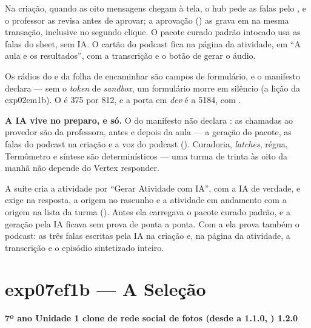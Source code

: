 Na criação, quando as oito mensagens chegam à tela, o hub pede as falas pelo
, e o professor
as revisa antes de aprovar; a aprovação () as grava
em  na mesma transação, inclusive no segundo clique. O
pacote curado padrão intocado usa as falas do sheet, sem IA. O cartão do
podcast fica na página da atividade, em \enquote{A aula e os resultados}, com a
transcrição e o botão de gerar o áudio.

\begin{atencao}
Os rádios do  e da folha de encaminhar são campos de formulário, e o manifesto declara
 --- sem o \emph{token} de \emph{sandbox}, um
formulário morre em silêncio (a lição da exp02em1b). O
 é 375 por 812, e a porta em \emph{dev} é a 5184, com
.
\end{atencao}

\begin{limitacao}
\textbf{A IA vive no preparo, e só.} O  do manifesto não
declara : as chamadas ao provedor são da professora, antes e depois da
aula --- a geração do pacote, as falas do podcast na criação e a voz do podcast
(). Curadoria, \emph{latches}, régua, Termômetro e
síntese são determinísticos --- uma turma de trinta às oito da manhã não depende
do Vertex responder.
\end{limitacao}

A suíte  cria a
atividade por \enquote{Gerar Atividade com IA}, com a IA de verdade, e exige
 na resposta, a origem  no rascunho e a atividade em
andamento com a origem  na lista da turma (). Antes ela
carregava o pacote curado padrão, e a geração pela IA ficava sem prova de ponta
a ponta. Com a  ela prova também o podcast: as três falas
escritas pela IA na criação e, na página da atividade, a transcrição e o
episódio sintetizado inteiro.

\section{exp07ef1b --- A Seleção}
\label{sec:exp07ef1b}

\textbf{7º ano \textperiodcentered{} Unidade 1 \textperiodcentered{} clone de
rede social de fotos \textperiodcentered{}  (desde a 1.1.0,
) \textperiodcentered{} 1.2.0}

